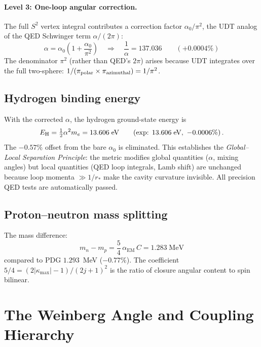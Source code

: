 \documentclass[aps,prd,twocolumn,superscriptaddress,nofootinbib,longbibliography]{revtex4-2}
\newcommand{\rstar}{r_{*}}
\newcommand{\kmax}{|\kappa_{\mathrm{max}}|}
\newcommand{\aEM}{\alpha_{\mathrm{EM}}}
\begin{document}
\paragraph{Level 3: One-loop angular correction.}  The full $S^2$
vertex integral contributes a correction factor $\alpha_0/\pi^2$,
the UDT analog of the QED Schwinger term $\alpha/(2\pi)$:
\begin{equation}\label{eq:alpha-corr}
  \boxed{\alpha = \alpha_0\!\left(1 + \frac{\alpha_0}{\pi^2}\right)
  \quad\Longrightarrow\quad
  \frac{1}{\alpha} = 137.036
  \qquad(+0.0004\%)}
\end{equation}
The denominator $\pi^2$ (rather than QED's $2\pi$) arises because UDT
integrates over the full two-sphere:
$1/(\pi_{\rm polar} \times \pi_{\rm azimuthal}) = 1/\pi^2$.

\subsection{Hydrogen binding energy}

With the corrected $\alpha$, the hydrogen ground-state energy is
\begin{equation}
  E_{\rm H} = \tfrac{1}{2}\alpha^2 m_e = 13.606\;\text{eV}
  \qquad(\text{exp: }13.606\;\text{eV},\ {-0.0006\%})\,.
\end{equation}
The $-0.57\%$ offset from the bare $\alpha_0$ is eliminated.  This
establishes the \emph{Global--Local Separation Principle}: the metric
modifies global quantities ($\alpha$, mixing angles) but local
quantities (QED loop integrals, Lamb shift) are unchanged because loop
momenta $\gg 1/\rstar$ make the cavity curvature invisible.  All
precision QED tests are automatically passed.

\subsection{Proton--neutron mass splitting}

The mass difference:
\begin{equation}\label{eq:pn}
  m_n - m_p = \frac{5}{4}\,\aEM\,C = 1.283\;\mathrm{MeV}
\end{equation}
compared to PDG $1.293$~MeV ($-0.77\%$).  The coefficient
$5/4 = (2\kmax - 1)/(2j+1)^2$ is the ratio of closure angular
content to spin bilinear.

\section{The Weinberg Angle and Coupling Hierarchy}\label{sec:weinberg}
\end{document}
